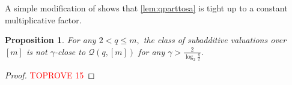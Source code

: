 \documentclass[11pt]{article}%
\newtheorem{proposition}[theorem]{Proposition}
\numberwithin{theorem}{subsection}
\newcommand{\classqm}{\mathcal{Q}(q,[m])}
\begin{document}
\noindent
A simple modification of \cite[Appendix C]{BhawalkarR11} shows that \cref{lem:qparttosa} is tight up to a constant multiplicative factor.

\begin{proposition}
\label{lem:salogclose}
For any $2< q \le m,$ the class of subadditive valuations over $[m]$ is not $\gamma$-close to $\classqm$ for any
$\gamma >\frac{2}{\log_2 \frac{q}{2}}.$
\end{proposition}
\begin{proof}\textcolor{red}{TOPROVE 15}\end{proof}
\end{document}
